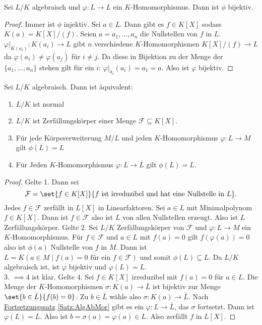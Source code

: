\begin{Lemma}
    Sei \(L/K\) algebraisch und \(\varphi\colon L\to L\) ein \(K\)-Homomorphismus. Dann ist \(\phi\) bijektiv.
\end{Lemma}
\begin{proof}
    Immer ist \(\phi\) injektiv.
    Sei \(a\in L\). Dann gibt es \(f\in K[X]\) sodass \(K(a)=K[X]/(f)\). Seien \(a=a_1,\dots,a_n\) die Nullstellen von \(f\) in \(L\).
    \(\varphi|_{K(a_i)}\colon K(a_i)\to L\) gibt \(n\) verschiedene \(K\)-Homomorphismen \(K[X]/(f)\to L\) da \(\varphi(a_i)\neq \varphi(a_j)\) für \(i\neq j\). Da diese in Bijektion zu der Menge der \(\{a_1,\dots,a_n\}\) stehen gilt für ein \(i\): \(\varphi|_{a_i}(a_i)=a_1=a\). Also ist \(\varphi\) bijektiv.
\end{proof}
\begin{Satz}
    Sei \(L/K\) algebraisch. Dann ist äquivalent:
    \begin{enumerate}
        \item \(L/K\) ist normal
        \item \(L/K\) ist Zerfällungskörper einer Menge \(\mathcal F\subseteq K[X]\).
        \item Für jede Körpererweiterung \(M/L\) und jeden \(K\)-Homomorphismus \(\varphi\colon L\to M\) gilt \(\phi(L)=L\)
        \item Für Jeden \(K\)-Homomorphismus \(\varphi\colon L\to\bar L\) gilt \(\phi(L)=L\).
    \end{enumerate}
\end{Satz}
\begin{proof}
    Gelte 1. Dann sei \[\mathcal F=\set{f\in K[X]}{ f\text{ ist irreduzibel und hat eine Nullstelle in \(L\)}}.\]
    Jedes \(f\in \mathcal F\) zerfällt in \(L[X]\) in Linearfaktoren.
    Sei \(a\in L\) mit Minimalpolynom \(f\in K[X]\). Dann ist \(f\in\mathcal F\) also ist \(L\) von allen Nullstellen erzeugt. Also ist \(L\) Zerfällungskörper.
    Gelte 2. Sei \(L/K\) Zerfällungskörper von \(\mathcal F\) und \(\varphi\colon L\to M\) ein \(K\)-Homomorphismus. Für \(f\in \mathcal F\) und \(a\in L\) mit \(f(a)=0\) gilt \(f(\varphi(a))=0\) also ist \(\phi(a)\) Nullstelle von \(f\) in \(M\).
    Dann ist \(L=K(a\in M\mid f(a)=0 \text{ für ein } f\in\mathcal F)\) und somit \(\phi(L)\subseteq L\). Da \(L/K\) algebraisch ist, ist \(\varphi\) bijektiv und \(\varphi(L)=L.\)\\
    3. \(\implies 4\) ist klar. Gelte \(4.\) Sei \(f\in K[X]\) irreduzibel mit \(f(a)=0\) für \(a\in L\).
    Die Menge der \(K\)-Homomorphismen \(\sigma\colon K(a)\to \bar L\) ist bijektiv zur Menge \(\set{b\in\bar L}{ f(b)=0}\). Zu \(b\in \bar L\) wähle also \(\sigma\colon K(a)\to \bar L\).
    Nach \hyperref[Satz:AlgAbMor]{Fortsetzungssatz} \ref{Satz:AlgAbMor} gibt es ein \(\varphi\colon L\to \bar L\), das \(\sigma\) fortsetzt. Dann ist \(\varphi(L)=L\). Also ist \(b=\sigma(a)=\varphi(a)\in L\). Also zerfällt \(f\) in \(L[X]\).
\end{proof}
